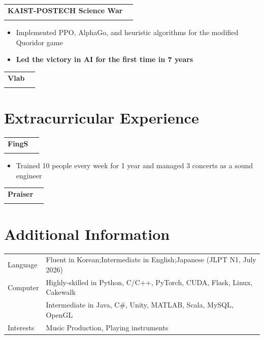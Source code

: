 \documentclass[10pt, a4paper]{article}
\makeatletter
\newlength{\datecol}
\newlength{\entrygap}
\newcommand{\datefmt}[1]{{\small\color{muted}#1}}
\newcommand{\locfmt}[1]{{\small\itshape\color{location}#1}}
\newcommand{\briefinfo}[1]{{\small\bfseries\itshape\color{muted}#1}}
\newcommand{\cvheadertwo}[4]{%
  \noindent
  \begin{tabularx}{\textwidth}{@{}Xr@{}}
    \makebox[\datecol][l]{\datefmt{#1}}%
    \textbf{#2} & \locfmt{#4} \\[-2pt]
    \hspace*{\datecol}{\small\itshape\color{muted}#3} &
  \end{tabularx}%
}
\newenvironment{cvlist}{%
  \begin{itemize}[
    leftmargin = \dimexpr\datecol + 0.18cm\relax,
    itemsep=1pt, parsep=0pt, topsep=3pt,
    label={\color{accent!60!white}\textbullet}
  ]
}{\end{itemize}\vspace{\entrygap}}
\makeatother
\begin{document}
\cvheadertwo
  {Jul.~2022\,$\sim$\,Sep.~2022}
  {KAIST-POSTECH Science War}{School Representative for AI Match}
  {}
\begin{cvlist}
  \item Implemented PPO, AlphaGo, and heuristic algorithms for the modified Quoridor game
  \item \textbf{Led the victory in AI for the first time in 7 years}
\end{cvlist}

\cvheadertwo
  {Sep.~2022\,$\sim$\,Sep.~2023}
  {Vlab}{AI Team Developer, AI Development Club}
  {}
\vspace{\entrygap}

\section{Extracurricular Experience}

\cvheadertwo
  {Sep.~2020\,$\sim$\,Jul.~2023}
  {FingS\enspace\briefinfo{Fingerstyle Guitar Club}}{Practice and Concert Manager, Group Leader}
  {}
\begin{cvlist}
  \item Trained 10 people every week for 1 year and managed 3 concerts as a sound engineer
\end{cvlist}

\cvheadertwo
  {Sep.~2022\,$\sim$\,Present}
  {Praiser\enspace\briefinfo{Christian Band Club}}{Electric Guitar, Bass Guitar Player}
  {}
\vspace{\entrygap}

\section{Additional Information}

\noindent
\begin{tabularx}{\textwidth}{@{}p{\datecol}@{}X@{}}
  Language  & Fluent in Korean;\enspace Intermediate in English;\enspace Japanese (JLPT N1, July 2026) \\[2pt]
  Computer  & Highly-skilled in Python, C/C++, PyTorch, CUDA, Flask, Linux, Cakewalk \\
            & Intermediate in Java, C\#, Unity, MATLAB, Scala, MySQL, OpenGL \\[2pt]
  Interests & Music Production, Playing instruments
\end{tabularx}
\end{document}
